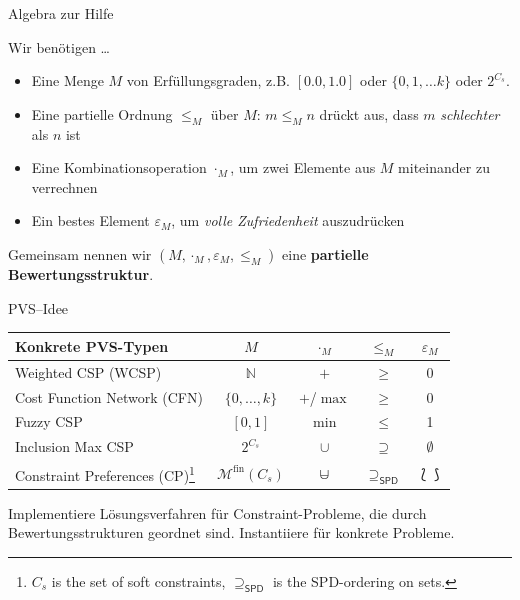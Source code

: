 \begin{frame}{Algebra zur Hilfe}

Wir benötigen \ldots 

\begin{itemize}
\item Eine Menge $M$ von Erfüllungsgraden, z.B. $[0.0, 1.0]$ oder $\{0, 1, \ldots k\}$ oder $2^{C_s}$. \pause 
\item Eine partielle Ordnung $\leq_M$ über $M$: $m \leq_M n$ drückt aus, dass $m$ \emph{schlechter} als $n$ ist \pause 
\item Eine Kombinationsoperation $\cdot_M$, um zwei Elemente aus $M$ miteinander zu verrechnen  \pause 
\item Ein bestes Element $\varepsilon_M$, um \emph{volle Zufriedenheit} auszudrücken \pause
\end{itemize}
  
  Gemeinsam nennen wir $(M, \cdot_M, \varepsilon_M, \leq_M)$ eine \textbf{partielle Bewertungsstruktur}.
  
  \hfill \emph{\cite{Gadducci2013,SchiendorferPvs2015}}
\end{frame}


%

\begin{frame}[fragile]{PVS--Idee}
\begin{center}
\begin{tabular}{l|c|c|c|c}
\textbf{Konkrete PVS-Typen} & $M$ & $\cdot_M$ & $\leq_M$ & $\varepsilon_M$ \\ 
\hline 
Weighted CSP (WCSP)& $\mathbb{N}$ & $+$ & $\geq$ & $0$ \\ 
Cost Function Network (CFN)& $\{0,\ldots,k\}$ & $+$/$\max$ & $\geq$ & $0$ \\ 
Fuzzy CSP & $[0,1]$ & $\min$ & $\leq$  & 1 \\ 
Inclusion Max CSP & $2^{C_s}$ & $\cup$ & $\supseteq$  & $\emptyset$ \\ 
Constraint Preferences (CP)\footnote{$C_s$ is the set of soft constraints, $\supseteq_{\mathsf{SPD}}$ is the SPD-ordering on sets.} &$\mathcal{M}^{\mathrm{fin}} (C_s)$ & $\mcup$ & $\supseteq_{\mathsf{SPD}}$ & $\lbag \rbag$ \\ 
\end{tabular} 
\end{center}

\begin{parchment}[Hauptidee]
Implementiere Lösungsverfahren für Constraint-Probleme, die durch Bewertungsstrukturen geordnet sind. Instantiiere für konkrete Probleme.
\end{parchment}
\end{frame}


